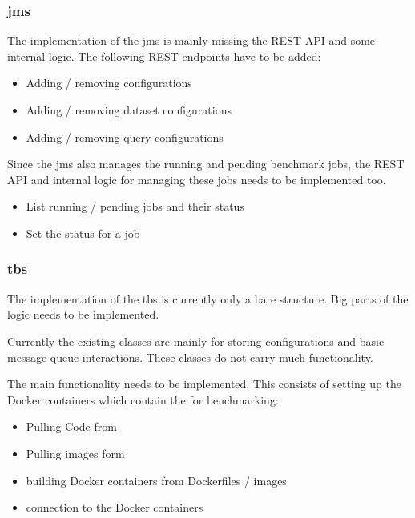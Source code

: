 \subsubsection{\acl{jms}}
The implementation of the \acl{jms} is mainly missing the REST API and some internal logic.
The following REST endpoints have to be added:

\begin{itemize}
	\item Adding / removing \ts{} configurations
	
	\item Adding / removing dataset configurations
	
	\item Adding / removing query configurations
\end{itemize}

Since the \ac{jms} also manages the running and pending benchmark jobs, the REST API and internal logic for managing these jobs needs to be implemented too.

\begin{itemize}
	\item List running / pending jobs and their status
	
	\item Set the status for a job
\end{itemize}



\subsubsection{\acl{tbs}}
The implementation of the \acl{tbs} is currently only a bare structure.
Big parts of the logic needs to be implemented.

Currently the existing classes are mainly for storing configurations and basic message queue interactions.
These classes do not carry much functionality.

The main functionality needs to be implemented.
This consists of setting up the Docker containers which contain the \tsp{} for benchmarking:

\begin{itemize}
	\item Pulling Code from \gh{}
	\item Pulling images form \dockh{}
	
	\item building Docker containers from Dockerfiles / images
	
	\item connection to the Docker containers
\end{itemize}

